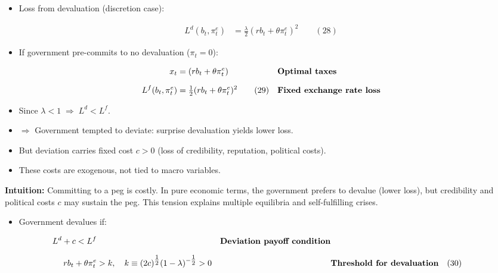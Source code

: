 \documentclass[12pt]{article}
\begin{document}
\begin{itemize}
    \item Loss from devaluation (discretion case):
\end{itemize}

\singlespacing
\begin{align}
L^d(b_t,\pi_t^e) &= \tfrac{\lambda}{2}(rb_t + \theta \pi_t^e)^2 \quad\quad (28)
\end{align}

\begin{itemize}
    \item If government pre-commits to no devaluation ($\pi_t=0$):
\end{itemize}

\singlespacing
\begin{align}
x_t &= (rb_t + \theta \pi_t^e) && \text{\textbf{Optimal taxes}} \\[6pt]
L^f(b_t,\pi_t^e) &= \tfrac{1}{2}(rb_t + \theta \pi_t^e)^2 \quad\quad (29) && \text{\textbf{Fixed exchange rate loss}}
\end{align}

\begin{itemize}
    \item Since $\lambda < 1 \;\Rightarrow\; L^d < L^f$.
    \item $\Rightarrow$ Government tempted to deviate: surprise devaluation yields lower loss.
    \item But deviation carries fixed cost $c > 0$ (loss of credibility, reputation, political costs).
    \item These costs are exogenous, not tied to macro variables.
\end{itemize}

\textbf{Intuition:} Committing to a peg is costly. In pure economic terms, the government prefers to devalue (lower loss), but credibility and political costs $c$ may sustain the peg. This tension explains multiple equilibria and self-fulfilling crises.

\begin{itemize}
    \item Government devalues if:
\end{itemize}

\singlespacing
\begin{align}
L^d + c < L^f && \text{\textbf{Deviation payoff condition}} \\[6pt]
rb_t + \theta \pi_t^e &> k, \quad k \equiv (2c)^{\tfrac{1}{2}}(1-\lambda)^{-\tfrac{1}{2}} > 0 && \text{\textbf{Threshold for devaluation}} \quad (30)
\end{align}
\end{document}
